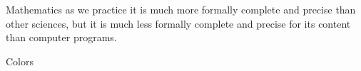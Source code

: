 
\begin{plQuote}
{}{}%
{Mathematics as we practice it is much more formally 
complete and precise than
other sciences, but it is much less formally complete and precise 
for its content than computer programs.
}
\end{plQuote}

\begin{plSection}{Colors}

\begin{plPlot}{}{}{}
\end{plPlot}
\begin{plTable}{}{}{}
\end{plTable}
\begin{plQuote}{}{}{}
\end{plQuote}
\begin{plAlgorithm}{}{}{}
\end{plAlgorithm}
\begin{plListing}{}{}{}
\end{plListing}
\begin{plScreen}{}{}{}
\end{plScreen}

\begin{plNote}{}{}{}
\end{plNote}

\begin{plExercise}{}{}{}
\end{plExercise}

\begin{plDefinition}{}{}{}
\end{plDefinition}
\begin{plExample}{}{}{}
\end{plExample}
\begin{plAxiom}{}{}{}
\end{plAxiom}
\begin{plAxiomSchema}{}{}{}
\end{plAxiomSchema}
\begin{plLemma}{}{}{}
\end{plLemma}
\begin{plTheorem}{}{}{}
\end{plTheorem}
\begin{plCorollary}{}{}{}
\end{plCorollary}
\begin{plDiagram}{}{}{}
\end{plDiagram}

\end{plSection}%
